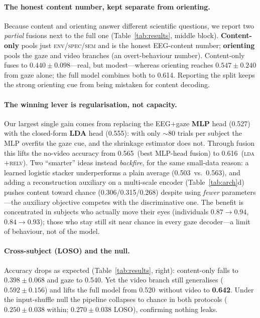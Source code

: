 \documentclass[10pt,twocolumn]{article}
\newcommand{\intraDirLda}{0.555}\newcommand{\intraDirLdaS}{0.231}
\newcommand{\intraDirMlp}{0.527}\newcommand{\intraDirMlpS}{0.215}
\newcommand{\intraMlpAvg}{0.563}\newcommand{\intraMlpAvgS}{0.167}
\newcommand{\intraMlpRel}{0.565}\newcommand{\intraMlpRelS}{0.185}
\newcommand{\intraMlpStack}{0.503}\newcommand{\intraMlpStackS}{0.184}
\newcommand{\intraLdaRel}{0.614}\newcommand{\intraLdaRelS}{0.205}
\newcommand{\intraLdaRelv}{0.616}\newcommand{\intraLdaRelvS}{0.201}
\newcommand{\cfusedI}{0.440}\newcommand{\cfusedIS}{0.098}
\newcommand{\sfusedI}{0.547}\newcommand{\sfusedIS}{0.240}
\newcommand{\msrEnv}{0.306}\newcommand{\msrSpec}{0.315}\newcommand{\msrSem}{0.268}
\newcommand{\nullFused}{0.250}\newcommand{\nullFusedS}{0.038}
\newcommand{\losoDirLda}{0.540}\newcommand{\losoDirLdaS}{0.211}
\newcommand{\losoVisFov}{0.592}\newcommand{\losoVisFovS}{0.156}
\newcommand{\losoCfused}{0.398}\newcommand{\losoCfusedS}{0.068}
\newcommand{\losoFusedVid}{0.642}\newcommand{\losoFusedVidS}{0.173}
\newcommand{\losoLdaRel}{0.520}\newcommand{\losoLdaRelS}{0.136}   %
\newcommand{\nullLosoFused}{0.270}\newcommand{\nullLosoFusedS}{0.038}
\newcommand{\pmv}[2]{$#1\!\pm\!#2$}
\begin{document}
\paragraph{The honest content number, kept separate from orienting.}
Because content and orienting answer different scientific questions, we report two
\emph{partial} fusions next to the full one (Table~\ref{tab:results}, middle
block). \textbf{Content-only} pools just \textsc{env}/\textsc{spec}/\textsc{sem}
and is the honest EEG-content number; \textbf{orienting} pools the gaze and video
branches (an overt-behaviour number). Content-only fuses to
\pmv{\cfusedI}{\cfusedIS}---real, but modest---whereas orienting reaches
\pmv{\sfusedI}{\sfusedIS} from gaze alone; the full model combines both to
\intraLdaRel. Reporting the split keeps the strong orienting cue from being
mistaken for content decoding.

\paragraph{The winning lever is regularisation, not capacity.}
Our largest single gain comes from replacing the EEG$+$gaze \textbf{MLP} head
(\intraDirMlp) with the closed-form \textbf{LDA} head (\intraDirLda): with only
$\sim\!80$ trials per subject the MLP overfits the gaze cue, and the shrinkage
estimator does not. Through fusion this lifts the no-video accuracy from
\intraMlpRel\ (best MLP-head fusion) to \intraLdaRelv\ (\textsc{lda}$+$\textsc{relv}).
Two ``smarter'' ideas instead \emph{backfire}, for the same small-data reason: a
learned logistic stacker underperforms a plain average (\intraMlpStack\ vs.\
\intraMlpAvg), and adding a reconstruction auxiliary on a multi-scale encoder
(Table~\ref{tab:arch}d) pushes content toward chance
(\msrEnv/\msrSpec/\msrSem) despite using \emph{fewer} parameters---the auxiliary
objective competes with the discriminative one. The benefit is concentrated in
subjects who actually move their eyes (individuals $0.87\!\to\!0.94$,
$0.84\!\to\!0.93$); those who stay still sit near chance in every gaze decoder---a
limit of behaviour, not of the model.

\paragraph{Cross-subject (LOSO) and the null.}
Accuracy drops as expected (Table~\ref{tab:results}, right): content-only falls to
\pmv{\losoCfused}{\losoCfusedS} and gaze to \losoDirLda. Yet the video branch
still generalises (\pmv{\losoVisFov}{\losoVisFovS}) and lifts the full model from
\losoLdaRel\ without video to \textbf{\losoFusedVid}. Under the input-shuffle null
the pipeline collapses to chance in both protocols
(\pmv{\nullFused}{\nullFusedS} within; \pmv{\nullLosoFused}{\nullLosoFusedS} LOSO),
confirming nothing leaks.
\end{document}
